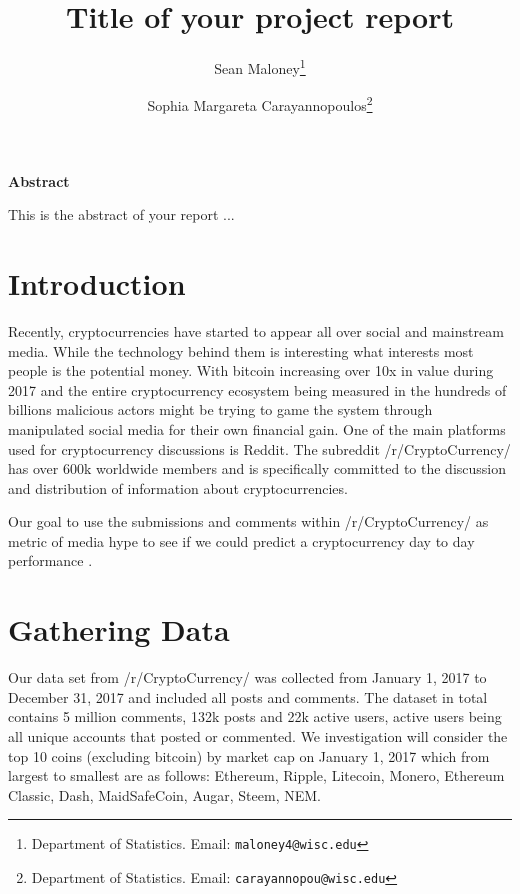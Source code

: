 \documentclass[12pt]{article}
\begin{document}
\sloppy


\title{Title of your project report}  

\author{
Sean Maloney\thanks{Department of Statistics.  Email: {\tt maloney4@wisc.edu}}  %
\and 
Sophia Margareta Carayannopoulos\thanks{Department of Statistics.  Email: {\tt  carayannopou@wisc.edu}}  %
}

\maketitle

\begin{center}
\textbf{Abstract}
\end{center}

This is the abstract of your report ... 


\thispagestyle{empty}

\newpage


\section{Introduction}\label{intro}
\indent \indent Recently, cryptocurrencies have started to appear all over social and mainstream media. While the technology behind them is interesting what interests most people is the potential money. With bitcoin increasing over 10x in value during 2017 and the entire cryptocurrency ecosystem being measured in the hundreds of billions malicious actors might be trying to game the system through manipulated social media for their own financial gain.
\indent One of the main platforms used for cryptocurrency discussions is Reddit. The subreddit /r/CryptoCurrency/ has over 600k worldwide members and is specifically committed to the discussion and distribution of information about cryptocurrencies. 

Our goal to use the submissions and comments within /r/CryptoCurrency/ as metric of media hype to see if we could predict a cryptocurrency day to day performance .

\section{Gathering Data}\label{datagather}
\indent \indent Our data set from  /r/CryptoCurrency/ was collected from January 1, 2017 to December 31, 2017 and included all posts and comments. The dataset in total contains 5 million comments, 132k posts and 22k active users, active users being all unique accounts that posted or commented. We investigation will consider the top 10 coins (excluding bitcoin) by market cap on January 1, 2017 which from largest to smallest are as follows: Ethereum, Ripple, Litecoin, Monero, Ethereum Classic, Dash, MaidSafeCoin, Augar, Steem, NEM.
\end{document}
